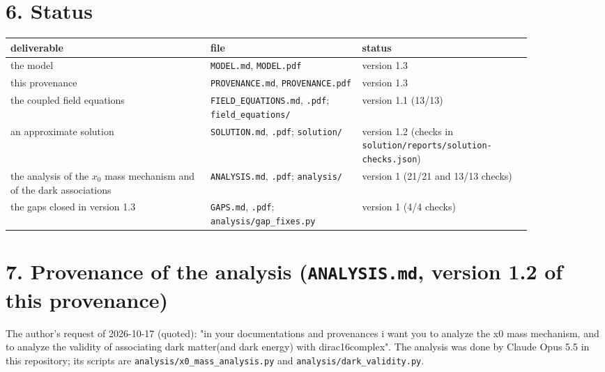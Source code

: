 \documentclass[11pt]{article}
\begin{document}
\section*{6. Status}

\begin{longtable}{>{\raggedright\arraybackslash}p{0.338\linewidth}>{\raggedright\arraybackslash}p{0.250\linewidth}>{\raggedright\arraybackslash}p{0.280\linewidth}}
\toprule
\textbf{deliverable} & \textbf{file} & \textbf{status} \\
\midrule
the model & \texttt{MODEL.\allowbreak{}md}, \texttt{MODEL.\allowbreak{}pdf} & version 1.3 \\
this provenance & \texttt{PROVENANCE.\allowbreak{}md}, \texttt{PROVENANCE.\allowbreak{}pdf} & version 1.3 \\
the coupled field equations & \texttt{FIELD\_\allowbreak{}EQUATIONS.\allowbreak{}md}, \texttt{.\allowbreak{}pdf}; \texttt{field\_\allowbreak{}equations/\allowbreak{}} & version 1.1 (13/13) \\
an approximate solution & \texttt{SOLUTION.\allowbreak{}md}, \texttt{.\allowbreak{}pdf}; \texttt{solution/\allowbreak{}} & version 1.2 (checks in \texttt{solution/\allowbreak{}reports/\allowbreak{}solution-{}\allowbreak{}checks.\allowbreak{}json}) \\
the analysis of the $x_0$ mass mechanism and of the dark associations & \texttt{ANALYSIS.\allowbreak{}md}, \texttt{.\allowbreak{}pdf}; \texttt{analysis/\allowbreak{}} & version 1 (21/21 and 13/13 checks) \\
the gaps closed in version 1.3 & \texttt{GAPS.\allowbreak{}md}, \texttt{.\allowbreak{}pdf}; \texttt{analysis/\allowbreak{}gap\_\allowbreak{}fixes.\allowbreak{}py} & version 1 (4/4 checks) \\
\bottomrule
\end{longtable}

\section*{7. Provenance of the analysis (\texttt{ANALYSIS.\allowbreak{}md}, version 1.2 of this provenance)}

The author's request of 2026-10-17 (quoted): "in your documentations and provenances i want you to analyze the x0 mass mechanism, and to analyze the validity of associating dark matter(and dark energy) with dirac16complex". The analysis was done by Claude Opus 5.5 in this repository; its scripts are \texttt{analysis/\allowbreak{}x0\_\allowbreak{}mass\_\allowbreak{}analysis.\allowbreak{}py} and \texttt{analysis/\allowbreak{}dark\_\allowbreak{}validity.\allowbreak{}py}.
\end{document}
